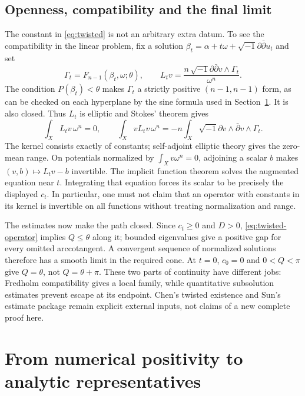 \documentclass[12pt,reqno]{amsart}
\newcommand{\ii}{\sqrt{-1}}
\newcommand{\ddc}{\ii\partial\bar\partial}
\begin{document}
\subsection{Openness, compatibility and the final limit}
The constant in \eqref{eq:twisted} is not an arbitrary extra datum. To see the compatibility in the linear problem, fix a solution $\beta_t=\alpha+t\omega+\ddc u_t$ and set
\[
 \Gamma_t=F_{n-1}(\beta_t,\omega;\theta),\qquad
 L_tv=\frac{n\,\ddc v\wedge\Gamma_t}{\omega^n}.
\]
The condition $P(\beta_t)<\theta$ makes $\Gamma_t$ a strictly positive $(n-1,n-1)$ form, as can be checked on each hyperplane by the sine formula used in Section~\ref{sec:numerical}. It is also closed. Thus $L_t$ is elliptic and Stokes' theorem gives
\begin{equation}\label{eq:linear-compatibility}
 \int_XL_tv\,\omega^n=0,\qquad
 \int_XvL_tv\,\omega^n
       =-n\int_X\ii\partial v\wedge\bar\partial v\wedge\Gamma_t.
\end{equation}
The kernel consists exactly of constants; self-adjoint elliptic theory gives the zero-mean range. On potentials normalized by $\int_Xv\omega^n=0$, adjoining a scalar $b$ makes $(v,b)\mapsto L_tv-b$ invertible. The implicit function theorem solves the augmented equation near $t$. Integrating that equation forces its scalar to be precisely the displayed $c_t$. In particular, one must not claim that an operator with constants in its kernel is invertible on all functions without treating normalization and range.

The estimates now make the path closed. Since $c_t\geq0$ and $D>0$, \eqref{eq:twisted-operator} implies $Q\leq\theta$ along it; bounded eigenvalues give a positive gap for every omitted arccotangent. A convergent sequence of normalized solutions therefore has a smooth limit in the required cone. At $t=0$, $c_0=0$ and $0<Q<\pi$ give $Q=\theta$, not $Q=\theta+\pi$. These two parts of continuity have different jobs: Fredholm compatibility gives a local family, while quantitative subsolution estimates prevent escape at its endpoint. Chen's twisted existence and Sun's estimate package remain explicit external inputs, not claims of a new complete proof here.

\section{From numerical positivity to analytic representatives}\label{sec:numerical}
\end{document}
